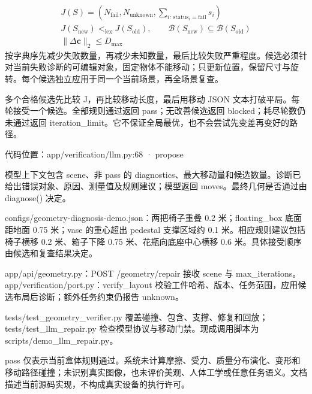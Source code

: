 \documentclass[10pt,a4paper]{article}
\begin{document}
\par{}
\[\begin{gathered}J(S)=\left(N_{\mathrm{fail}},N_{\mathrm{unknown}},\sum_{i:\,\mathrm{status}_i=\mathrm{fail}}s_i\right)\\ J(S_{\mathrm{new}})<_{\mathrm{lex}}J(S_{\mathrm{old}}),\qquad \mathcal B(S_{\mathrm{new}})\subseteq\mathcal B(S_{\mathrm{old}})\\ \|\Delta\mathbf c\|_2\le D_{\max}\end{gathered}\]
按字典序先减少失败数量，再减少未知数量，最后比较失败严重程度。候选必须针对当前失败诊断的可编辑对象，固定物体不能移动；只更新位置，保留尺寸与旋转。每个候选独立应用于同一个当前场景，再全场景复查。\par
多个合格候选先比较 J，再比较移动长度，最后用移动 JSON 文本打破平局。每轮接受一个候选。全部规则通过返回 pass；无改善候选返回 blocked；耗尽轮数仍未通过返回 iteration\_limit。它不保证全局最优，也不会尝试先变差再变好的路径。\par
\par{}
{\footnotesize\color{ink} 代码位置：app/verification/llm.py:68 · propose\par}
模型上下文包含 scene、非 pass 的 diagnostics、最大移动量和候选数量。诊断已给出错误对象、原因、测量值及规则建议；模型返回 moves。最终几何是否通过由 diagnose() 决定。\par
\par{}
configs/geometry-diagnosis-demo.json：两把椅子重叠 0.2 米；floating\_box 底面距地面 0.75 米；vase 的重心超出 pedestal 支撑区域约 0.1 米。相应规则建议包括椅子横移 0.2 米、箱子下降 0.75 米、花瓶向底座中心横移 0.6 米。具体接受顺序由候选和复查结果决定。\par
\par{}
app/api/geometry.py：POST /geometry/repair 接收 scene 与 max\_iterations。app/verification/port.py：verify\_layout 校验工件哈希、版本、任务范围，应用候选布局后诊断；额外任务约束仍报告 unknown。\par
{\footnotesize\color{ink} tests/test\_geometry\_verifier.py 覆盖碰撞、包含、支撑、修复和回放；tests/test\_llm\_repair.py 检查模型协议与移动门禁。现成调用脚本为 scripts/demo\_llm\_repair.py。\par}
\par{}
pass 仅表示当前盒体规则通过。系统未计算摩擦、受力、质量分布演化、变形和移动路径碰撞；未识别真实图像，也未评价美观、人体工学或任意任务语义。文档描述当前源码实现，不构成真实设备的执行许可。\par
\end{document}
